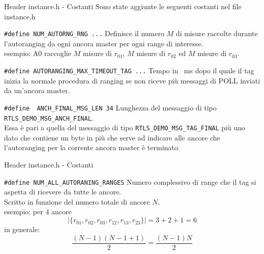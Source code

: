 \begin{frame}[fragile, shrink=10]{Header instance.h - Costanti}
  Sono state aggiunte le seguenti costanti nel file instance.h
  \begin{block}{\lstinline!#define NUM_AUTORNG_RNG ...!}
  Definisce il numero $M$ di misure raccolte durante l'autoranging da ogni ancora master per ogni range di interesse.\\
  \textcolor{dgreen}{esempio:} A0 raccoglie $M$ misure di $r_{01}$, $M$ misure di $r_{02}$ ed $M$ misure di $r_{03}$.
  \end{block}

  \begin{block}{\lstinline!#define AUTORANGING_MAX_TIMEOUT_TAG ...!}
  Tempo in \SI{}{\milli\second} dopo il quale il tag inizia la normale procedura di ranging se non
  riceve più messaggi di POLL inviati da un'ancora master.
  \end{block}

  \begin{block}{\lstinline!#define  ANCH_FINAL_MSG_LEN 34!}
    Lunghezza del messaggio di tipo \lstinline!RTLS_DEMO_MSG_ANCH_FINAL!.\\
    Essa è pari a quella del messaggio di tipo \lstinline!RTLS_DEMO_MSG_TAG_FINAL! più uno dato
    che contiene un byte in più che serve ad indicare alle ancore che l'autoranging per la corrente
    ancora master è terminato.
  \end{block}

\end{frame}

\begin{frame}[fragile]{Header instance.h - Costanti}
  \begin{block}{\lstinline!#define NUM_ALL_AUTORANING_RANGES!}
  Numero complessivo di range che il tag si aspetta di ricevere da tutte le ancore.\\
  Scritto in funzione del numero totale di ancore $N$.\\
  \textcolor{dgreen}{esempio:} per $4$ ancore
  \[
  |\{r_{01}, r_{02}, r_{03}, r_{12}, r_{13}, r_{23}\}| = 3 + 2 + 1 = 6
  \]
  \alert{in generale:}
  \[
  \frac{(N-1) (N-1+1)}{2} = \frac{(N-1)N}{2}
  \]
  \end{block}
\end{frame}

